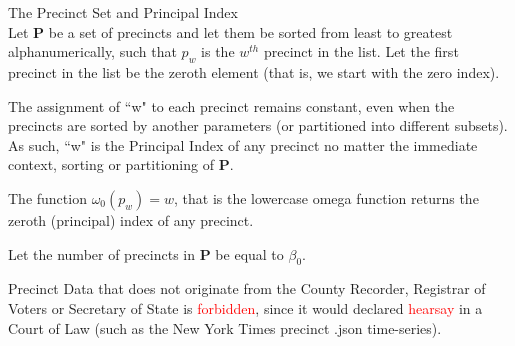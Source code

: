 \begin{definition}{The Precinct Set and Principal Index}\\
Let \textbf{P} be a set of precincts and let them be sorted from least to greatest alphanumerically, such that $p_{w}$ is the $w^{th}$ precinct in the list. Let the first precinct in the list be the zeroth element (that is, we start with the zero index).

The assignment of ``w" to each precinct remains constant, even when the precincts are sorted by another parameters (or partitioned into different subsets). As such, ``w" is the Principal Index of any precinct no matter the immediate context, sorting or partitioning of \textbf{P}.

The function $\omega_{0}(p_{w})=w$, that is the lowercase omega function returns the zeroth (principal) index of any precinct.

Let the number of precincts in \textbf{P} be equal to $\beta_{0}$.

Precinct Data that does not originate from the County Recorder, Registrar of Voters or Secretary of State is 
\textcolor{red}{forbidden}, since it would declared \textcolor{red}{hearsay} in a Court of Law (such as the New York Times precinct .json time-series).
\end{definition}

